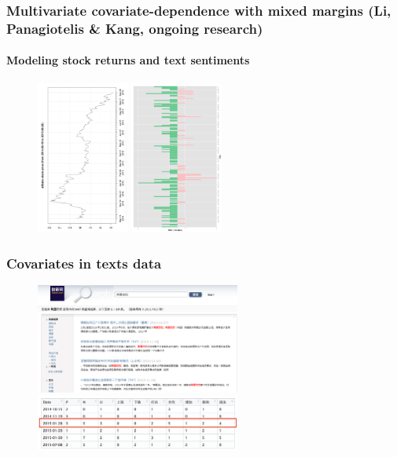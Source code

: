 \documentclass[10pt,aspectratio=169]{beamer}
\begin{document}
\begin{frame}
  \frametitle{Multivariate covariate-dependence with mixed margins (Li, Panagiotelis \&
    Kang, ongoing research)}
  \framesubtitle{Modeling stock returns and text sentiments}
  \begin{figure}[!h]
    \centering
    \includegraphics[width=0.27\textwidth]{Alibaba-Stock-Price-R}
    \includegraphics[width=0.27\textwidth]{Sen-Date-R}
  \end{figure}



\end{frame}


\begin{frame}
  \frametitle{Covariates in texts data}
  \begin{figure}
    \centering
    \includegraphics[width=0.6\textwidth]{Caixin}\\
    \includegraphics[width=0.6\textwidth]{TextsCovs-New}
  \end{figure}
\end{frame}
\end{document}
